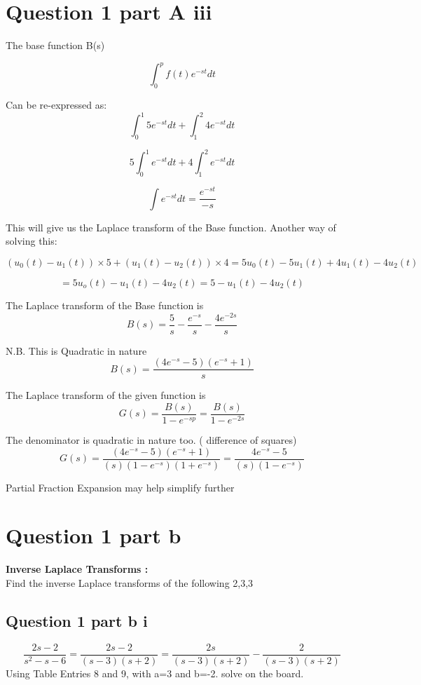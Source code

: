 \documentclass[11pt,a4paper,titlepage,oneside,openany]{article}
\numberwithin{equation}{section}
\numberwithin{algorithm}{section}
\numberwithin{figure}{section}
\numberwithin{table}{section}
\begin{document}
\section*{Question 1 part A iii }
{\large
The base function B(s)

\[\int^{p}_{0} f(t)e^{-st}dt\]

Can be re-expressed as: 
\[\int^{1}_{0} 5e^{-st}dt + \int^{2}_{1} 4e^{-st}dt \]

\[5\int^{1}_{0} e^{-st}dt + 4\int^{2}_{1} e^{-st}dt \]

\[\int e^{-st}dt = \frac{e^{-st}}{-s}\]


This will give us the Laplace transform of the Base function.%
Another way of solving this:

\[ (u_0(t) -  u_1(t))  \times 5 + (u_1(t) -  u_2(t))  \times 4 = 5u_0(t) -  5u_1(t) + 4u_1(t) -  4u_2(t)\]

\[= 5 u_o(t) -  u_1(t) - 4u_2(t) = 5 -  u_1(t) - 4u_2(t)  \]

The Laplace transform of the Base function is
\[B(s) = \frac{5}{s}- \frac{e^{-s}}{s} - \frac{4e^{-2s}}{s}  \]

N.B. This is Quadratic in nature 
\[B(s) = \frac{(4e^{-s}-5)(e^{-s}+1)}{s}  \]

The Laplace transform of the given function is
\[G(s) = \frac{B(s)}{1-e^{-sp}} = \frac{B(s)}{1-e^{-2s}}  \]

The denominator is quadratic in nature too. ( difference of squares)
\[G(s) = \frac{(4e^{-s}-5)(e^{-s}+1)}{(s)(1-e^{-s})(1+e^{-s})} =  \frac{4e^{-s}-5}{(s)(1-e^{-s})} \]

Partial Fraction Expansion may help simplify further
}
\newpage
\section*{Question 1 part b}

\textbf{Inverse Laplace Transforms : } \\
Find the inverse Laplace transforms of the following 2,3,3

\subsection*{Question 1 part b i}
\[\frac{2s-2}{s^2-s-6} = \frac{2s-2}{(s-3)(s+2)} = \frac{2s}{(s-3)(s+2)}-\frac{2}{(s-3)(s+2)}\]
Using Table Entries 8 and 9, with a=3 and b=-2. solve on the board.
\end{document}
